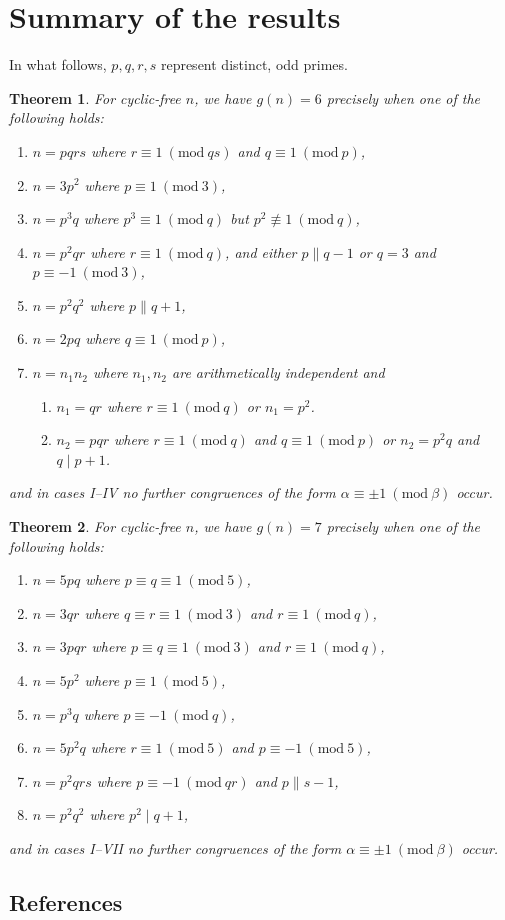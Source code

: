 \documentclass{article}
\newcommand{\Mod}[1]{\ (\mathrm{mod} \ #1)}
\theoremstyle{plain}
\newtheorem{thm}{Theorem}[section]
\theoremstyle{definition}
\begin{document}
\section{Summary of the results}
In what follows, $p, q, r, s$ represent distinct, odd primes.
\nopagebreak
{}
\begin{thm}
	For cyclic-free $n$, we have $g(n) = 6$ precisely when one of the following holds:
	\begin{enumerate} \listspace
		\item $n = pqrs$ where $r \equiv 1 \Mod{qs}$ and $q \equiv 1 \Mod{p}$,
		\item $n = 3p^2$ where $p \equiv 1 \Mod{3}$,
		\item $n = p^3 q$ where $p^3 \equiv 1 \Mod{q}$ but $p^2 \not\equiv 1 \Mod{q}$,
		\item $n = p^2 q r$ where $r \equiv 1 \Mod{q}$, and either $p \parallel q - 1$ or $q = 3$ and $p \equiv -1 \Mod{3}$,
		\item $n = p^2 q^2$ where $p \parallel q + 1$,
		\item $n = 2pq$ where $q \equiv 1 \Mod{p}$,
		\item $n = n_1 n_2$ where $n_1, n_2$ are arithmetically independent and
		\begin{enumerate}
			\item $n_1 = qr$ where $r \equiv 1 \Mod{q}$ or $n_1 = p^2$.
			\item $n_2 = pqr$ where $r \equiv 1 \Mod{q}$ and $q \equiv 1 \Mod{p}$ or $n_2 = p^2 q$ and $q \mid p + 1$.
		\end{enumerate}
	\end{enumerate} \textspace
	and in cases I--IV no further congruences of the form $\alpha \equiv \pm 1 \Mod{\beta}$ \nolinebreak[4] \mbox{occur}.
\end{thm}
\begin{thm}
	For cyclic-free $n$, we have $g(n) = 7$ precisely when one of the following holds:
	\begin{enumerate}	\listspace
		\item $n = 5pq$ where $p \equiv q \equiv 1 \Mod{5}$,
		\item $n = 3qr$ where $q \equiv r \equiv 1 \Mod{3}$ and $r \equiv 1 \Mod{q}$,
		\item $n = 3pqr$ where $p \equiv q \equiv 1 \Mod{3}$ and $r \equiv 1 \Mod{q}$,
		\item $n = 5p^2$ where $p \equiv 1 \Mod{5}$,
		\item $n = p^3 q$ where $p \equiv -1 \Mod{q}$,
		\item $n = 5p^2 q$ where $r \equiv 1 \Mod{5}$ and $p \equiv -1 \Mod{5}$,
		\item $n = p^2 q r s$ where $p \equiv -1 \Mod{qr}$ and $p \parallel s - 1$,
		\item $n = p^2 q^2$ where $p^2 \mid q + 1$,
	\end{enumerate} \textspace
	and in cases I--VII no further congruences of the form $\alpha \equiv \pm 1 \Mod{\beta}$ \nolinebreak[4] \mbox{occur}.
\end{thm}

\begin{center}\section*{References}\end{center}
\printbibliography[heading=none]
\end{document}
